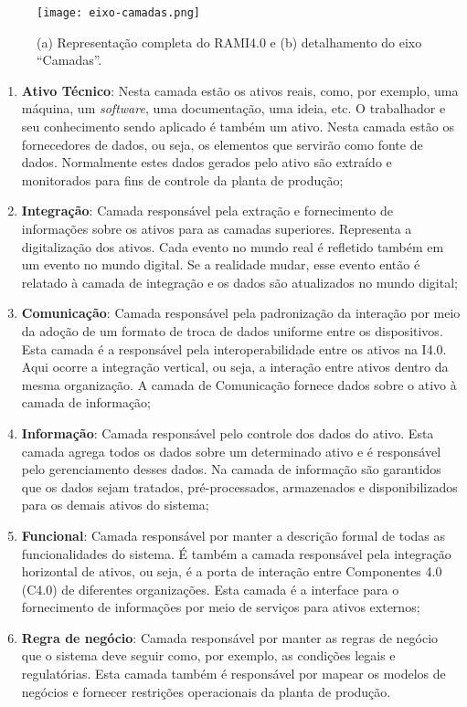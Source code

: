 \begin{figure}[htb]
	\centering
	\texttt{[image: eixo-camadas.png]}
	\caption{(a) Representação completa do RAMI4.0 e (b) detalhamento do eixo ``Camadas''.}
	\label{fig:eixo-camadas}
\end{figure}

\begin{enumerate}
	\item \textbf{Ativo Técnico}: Nesta camada estão os ativos reais, como, por exemplo, uma máquina, um \textit{software}, uma documentação, uma ideia, etc. O trabalhador e seu conhecimento sendo aplicado é também um ativo. Nesta camada estão os fornecedores de dados, ou seja, os elementos que servirão como fonte de dados. Normalmente estes dados gerados pelo ativo são extraído e monitorados para fins de controle da planta de produção;

	\item \textbf{Integração}: Camada responsável pela extração e fornecimento de informações sobre os ativos para as camadas superiores. Representa a digitalização dos ativos. Cada evento no mundo real é refletido também em um evento no mundo digital. Se a realidade mudar, esse evento então é relatado à camada de integração e os dados são atualizados no mundo digital;

	\item \textbf{Comunicação}: Camada responsável pela padronização da interação por meio da adoção de um formato de troca de dados uniforme entre os dispositivos. Esta camada é a responsável pela interoperabilidade entre os ativos na I4.0. Aqui ocorre a integração vertical, ou seja, a interação entre ativos dentro da mesma organização. A camada de Comunicação fornece dados sobre o ativo à camada de informação;

	\item \textbf{Informação}: Camada responsável pelo controle dos dados do ativo. Esta camada agrega todos os dados sobre um determinado ativo e é responsável pelo gerenciamento desses dados. Na camada de informação são garantidos que os dados sejam tratados, pré-processados, armazenados e disponibilizados para os demais ativos do sistema;

	\item \textbf{Funcional}: Camada responsável por manter a descrição formal de todas as funcionalidades do sistema. É também a camada responsável pela integração horizontal de ativos, ou seja, é a porta de interação entre Componentes 4.0 (C4.0) de diferentes organizações. Esta camada é a interface para o fornecimento de informações por meio de serviços para ativos externos;

	\item \textbf{Regra de negócio}: Camada responsável por manter as regras de negócio que o sistema deve seguir como, por exemplo, as condições legais e regulatórias. Esta camada também é responsável por mapear os modelos de negócios e fornecer restrições operacionais da planta de produção.
\end{enumerate}

